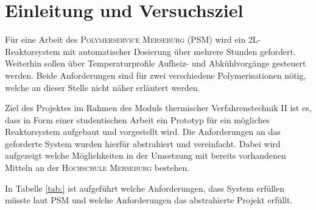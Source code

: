 \section{Einleitung und Versuchsziel}
\label{sec:aufgabenstellung}

Für eine Arbeit des \textsc{Polymerservice Merseburg (PSM)} wird ein 2L-Reaktorsystem mit automatischer Dosierung über mehrere Stunden gefordert. Weiterhin sollen über Temperaturprofile Aufheiz- und Abkühlvorgänge gesteuert werden. Beide Anforderungen sind für zwei verschiedene Polymerisationen nötig, welche an dieser Stelle nicht näher erläutert werden. 

Ziel des Projektes im Rahmen des Moduls thermischer Verfahrenstechnik II ist es, dass in Form einer studentischen Arbeit ein Prototyp für ein mögliches Reaktorsystem aufgebaut und vorgestellt wird. Die Anforderungen an das geforderte System wurden hierfür abstrahiert und vereinfacht. Dabei wird aufgezeigt welche Möglichkeiten in der Umsetzung mit bereits vorhandenen Mitteln an der \textsc{Hochschule Merseburg} bestehen.

In Tabelle \ref{tab:} ist aufgeführt welche Anforderungen, dass System erfüllen müsste laut \textsc{PSM} und welche Anforderungen das abstrahierte Projekt erfüllt.